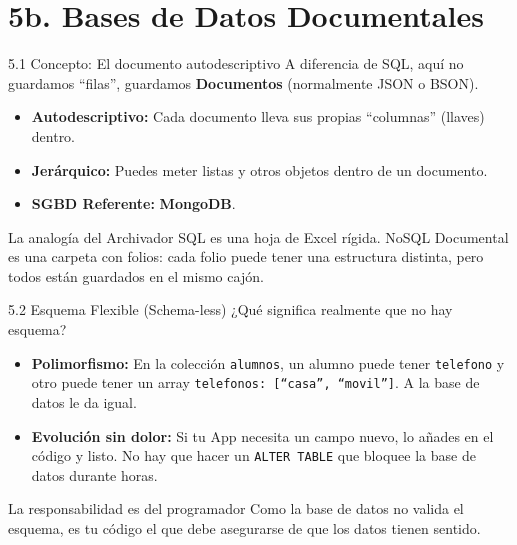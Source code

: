 \section{5b. Bases de Datos Documentales}

\begin{frame}{5.1 Concepto: El documento autodescriptivo}
    A diferencia de SQL, aquí no guardamos ``filas'', guardamos \textbf{Documentos} (normalmente JSON o BSON).
    \begin{itemize}
        \item \textbf{Autodescriptivo:} Cada documento lleva sus propias ``columnas'' (llaves) dentro.
        \item \textbf{Jerárquico:} Puedes meter listas y otros objetos dentro de un documento.
        \item \textbf{SGBD Referente:} \textbf{MongoDB}.
    \end{itemize}
    \begin{exampleblock}{La analogía del Archivador}
        SQL es una hoja de Excel rígida. NoSQL Documental es una carpeta con folios: cada folio puede tener una estructura distinta, pero todos están guardados en el mismo cajón.
    \end{exampleblock}
\end{frame}

\begin{frame}{5.2 Esquema Flexible (Schema-less)}
    ¿Qué significa realmente que no hay esquema?
    \begin{itemize}
        \item \textbf{Polimorfismo:} En la colección \texttt{alumnos}, un alumno puede tener \texttt{telefono} y otro puede tener un array \texttt{telefonos: [``casa'', ``movil'']}. A la base de datos le da igual.
        \item \textbf{Evolución sin dolor:} Si tu App necesita un campo nuevo, lo añades en el código y listo. No hay que hacer un \texttt{ALTER TABLE} que bloquee la base de datos durante horas.
    \end{itemize}
    \begin{alertblock}{La responsabilidad es del programador}
        Como la base de datos no valida el esquema, es tu código el que debe asegurarse de que los datos tienen sentido.
    \end{alertblock}
\end{frame}


